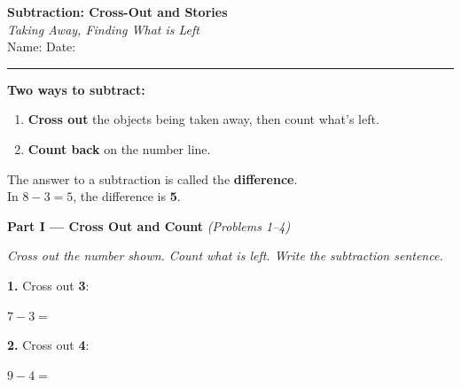 \documentclass[12pt, letterpaper]{article}
\newcommand{\answerline}{\underline{\hspace{2.5cm}}}
\newcommand{\biganswerline}{\underline{\hspace{4cm}}}
\newcommand{\numbox}{\fbox{\hspace{0.6cm}\vphantom{0}}}
\begin{document}
\begin{center}
  {\LARGE\textbf{\textcolor{scholared}{Subtraction: Cross-Out and Stories}}}\\[4pt]
  {\Large\textcolor{scholagold}{\textit{Taking Away, Finding What is Left}}}\\[6pt]
  {\small Name: \biganswerline \hspace{1cm} Date: \answerline}
\end{center}

\vspace{4pt}
\noindent\textcolor{scholared}{\rule{\linewidth}{1pt}}
\vspace{4pt}


\begin{lessonbox}
\textbf{Two ways to subtract:}
\begin{enumerate}[leftmargin=2em, itemsep=2pt]
  \item \textbf{Cross out} the objects being taken away, then count what's left.
  \item \textbf{Count back} on the number line.
\end{enumerate}
\medskip
The answer to a subtraction is called the \textbf{difference}.\\
In $8 - 3 = 5$, the difference is \textbf{5}.
\end{lessonbox}

\bigskip

\noindent\textcolor{scholared}{\large\textbf{Part I — Cross Out and Count}} \hfill \textit{(Problems 1–4)}

\medskip\noindent\textit{Cross out the number shown. Count what is left. Write the subtraction sentence.}

\bigskip

\noindent\textbf{1.} Cross out \textbf{3}:
\hfill $7 - 3 = $ \numbox

\bigskip
\noindent\textbf{2.} Cross out \textbf{4}:
\hfill $9 - 4 = $ \numbox
\end{document}
